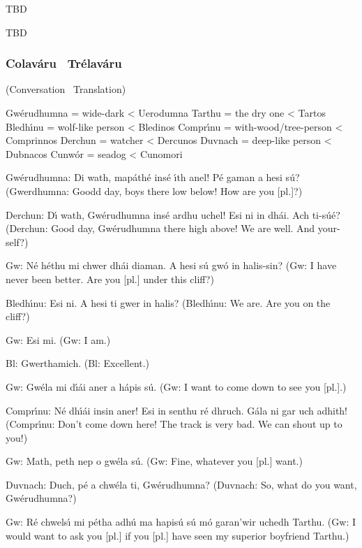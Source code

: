 \begingroup
\fontsize{10pt}{12pt}\selectfont
\begin{leftbubbles}TBD\end{leftbubbles}
\begin{rightbubbles}TBD\end{rightbubbles}
\endgroup

\newpage
\subsubsection{Colav\'{a}ru \textendash\ Tr\'{e}lav\'{a}ru}
(Conversation \textendash\ Translation)

Gw\'{e}rudhumna = wide-dark < Uerodumna
Tarthu = the dry one < Tartos
Bledh\'{\i}nu = wolf-like person < Bledinos
Compr\'{\i}nu = with-wood/tree-person < Comprinnos
Derchun = watcher < Dercunos
Duvnach = deep-like person < Dubnacos
Cunw\'{o}r = seadog < Cunomori

Gw\'{e}rudhumna: Di wath, map\'{a}th\'{e} ins\'{e} \'{\i}th anel! P\'{e} gaman a hesi s\'{u}?
(Gwerdhumna: Goodd day, boys there low below! How are you [pl.]?)

Derchun: D\'{\i} wath, Gw\'{e}rudhumna ins\'{e} ardhu uchel! Esi ni in dh\'{a}i. Ach ti-s\'{u}\'{e}?
(Derchun: Good day, Gw\'{e}rudhumna there high above! We are well. And your-self?)

Gw: N\'{e} h\'{e}thu mi chwer dh\'{a}i diaman. A hesi s\'{u} gw\'{o} in halis-sin?
(Gw: I have never been better. Are you [pl.] under this cliff?)

Bledh\'{\i}nu: Esi ni. A hesi ti gwer in halis?
(Bledh\'{\i}nu: We are. Are you on the cliff?)

Gw: Esi mi.
(Gw: I am.)

Bl: Gwerthamich.
(Bl: Excellent.)

Gw: Gw\'{e}la mi d\'{\i}\'{a}i aner a h\'{a}pis s\'{u}.
(Gw: I want to come down to see you [pl.].)

Compr\'{\i}nu: N\'{e} dh\'{\i}\'{a}i insin aner! Esi in senthu r\'{e} dhruch. G\'{a}la ni gar uch adhith!
(Compr\'{\i}nu: Don't come down here! The track is very bad. We can shout up to you!)

Gw: Math, peth nep o gw\'{e}la s\'{u}.
(Gw: Fine, whatever you [pl.] want.)

Duvnach: Duch, p\'{e} a chw\'{e}la ti, Gw\'{e}rudhumna?
(Duvnach: So, what do you want, Gw\'{e}rudhumna?)

Gw: R\'{e} chwels\'{\i} mi p\'{e}tha adh\'{u} ma hapis\'{u} s\'{u} m\'{o} garan’wir uchedh Tarthu.
(Gw: I would want to ask you [pl.] if you [pl.] have seen my superior boyfriend Tarthu.)

